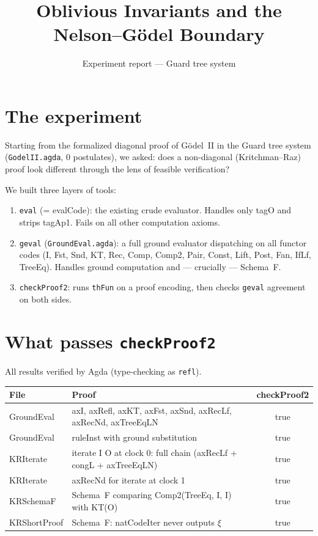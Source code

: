 \documentclass[11pt]{article}
\title{Oblivious Invariants and the Nelson--G\"odel Boundary}
\author{Experiment report --- Guard tree system}
\date{}
\begin{document}
\maketitle

\section{The experiment}

Starting from the formalized diagonal proof of G\"odel~II in the Guard tree system (\texttt{GodelII.agda}, 0 postulates), we asked: does a non-diagonal (Kritchman--Raz) proof look different through the lens of feasible verification?

We built three layers of tools:

\begin{enumerate}
\item \texttt{eval} (= evalCode): the existing crude evaluator. Handles only tagO and strips tagAp1. Fails on all other computation axioms.

\item \texttt{geval} (\texttt{GroundEval.agda}): a full ground evaluator dispatching on all functor codes (I, Fst, Snd, KT, Rec, Comp, Comp2, Pair, Const, Lift, Post, Fan, IfLf, TreeEq). Handles ground computation and --- crucially --- Schema~F.

\item \texttt{checkProof2}: runs \texttt{thFun} on a proof encoding, then checks \texttt{geval} agreement on both sides.
\end{enumerate}

\section{What passes \texttt{checkProof2}}

All results verified by Agda (type-checking as \texttt{refl}).

\begin{center}
\begin{tabular}{lp{7cm}c}
\toprule
\textbf{File} & \textbf{Proof} & \textbf{checkProof2} \\
\midrule
GroundEval & axI, axRefl, axKT, axFst, axSnd, axRecLf, axRecNd, axTreeEqLN & true \\
GroundEval & ruleInst with ground substitution & true \\
KRIterate & iterate I O at clock 0: full chain (axRecLf + congL + axTreeEqLN) & true \\
KRIterate & axRecNd for iterate at clock 1 & true \\
KRSchemaF & Schema~F comparing Comp2(TreeEq, I, I) with KT(O) & true \\
KRShortProof & Schema~F: natCodeIter never outputs $\xi$ & true \\
\bottomrule
\end{tabular}
\end{center}
\end{document}
